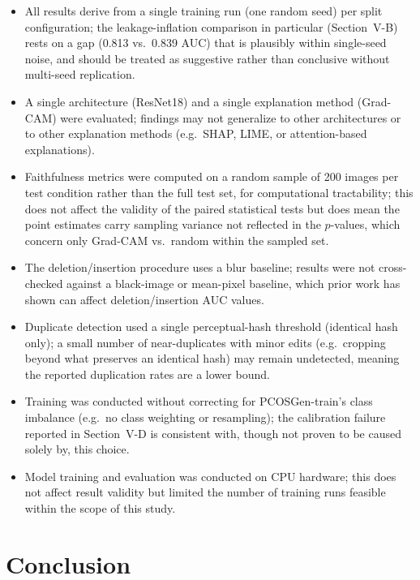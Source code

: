 \documentclass[conference]{IEEEtran}
\begin{document}
\begin{itemize}
\item All results derive from a single training run (one random seed) per split configuration; the leakage-inflation comparison in particular (Section~V-B) rests on a gap (0.813 vs.\ 0.839 AUC) that is plausibly within single-seed noise, and should be treated as suggestive rather than conclusive without multi-seed replication.
\item A single architecture (ResNet18) and a single explanation method (Grad-CAM) were evaluated; findings may not generalize to other architectures or to other explanation methods (e.g.\ SHAP, LIME, or attention-based explanations).
\item Faithfulness metrics were computed on a random sample of 200 images per test condition rather than the full test set, for computational tractability; this does not affect the validity of the paired statistical tests but does mean the point estimates carry sampling variance not reflected in the $p$-values, which concern only Grad-CAM vs.\ random within the sampled set.
\item The deletion/insertion procedure uses a blur baseline; results were not cross-checked against a black-image or mean-pixel baseline, which prior work has shown can affect deletion/insertion AUC values.
\item Duplicate detection used a single perceptual-hash threshold (identical hash only); a small number of near-duplicates with minor edits (e.g.\ cropping beyond what preserves an identical hash) may remain undetected, meaning the reported duplication rates are a lower bound.
\item Training was conducted without correcting for PCOSGen-train's class imbalance (e.g.\ no class weighting or resampling); the calibration failure reported in Section~V-D is consistent with, though not proven to be caused solely by, this choice.
\item Model training and evaluation was conducted on CPU hardware; this does not affect result validity but limited the number of training runs feasible within the scope of this study.
\end{itemize}

\section{Conclusion}
\end{document}
